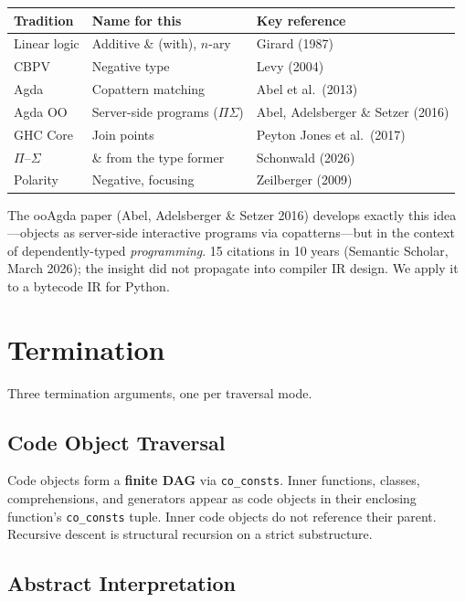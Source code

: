 \documentclass[11pt,a4paper]{article}
\begin{document}
\begin{table}[h]
\centering
\small
\begin{tabular}{@{}lll@{}}
\toprule
\textbf{Tradition} & \textbf{Name for this} & \textbf{Key reference} \\
\midrule
Linear logic   & Additive \& (with), $n$-ary & Girard (1987) \\
CBPV           & Negative type             & Levy (2004) \\
Agda           & Copattern matching        & Abel et al.\ (2013) \\
Agda OO        & Server-side programs ($\Pi\Sigma$) & Abel, Adelsberger \& Setzer (2016) \\
GHC Core       & Join points               & Peyton Jones et al.\ (2017) \\
$\Pi$--$\Sigma$ & \& from the type former  & Schonwald (2026) \\
Polarity       & Negative, focusing        & Zeilberger (2009) \\
\bottomrule
\end{tabular}
\end{table}

The ooAgda paper (Abel, Adelsberger \& Setzer 2016) develops exactly
this idea---objects as server-side interactive programs via
copatterns---but in the context of dependently-typed
\emph{programming}. 15 citations in 10 years (Semantic Scholar, March
2026); the insight did not propagate into compiler IR design. We apply
it to a bytecode IR for Python.

\section{Termination}

Three termination arguments, one per traversal mode.

\subsection{Code Object Traversal}

Code objects form a \textbf{finite DAG} via \texttt{co\_consts}. Inner
functions, classes, comprehensions, and generators appear as code
objects in their enclosing function's \texttt{co\_consts} tuple. Inner
code objects do not reference their parent. Recursive descent is
structural recursion on a strict substructure.

\subsection{Abstract Interpretation}
\end{document}
